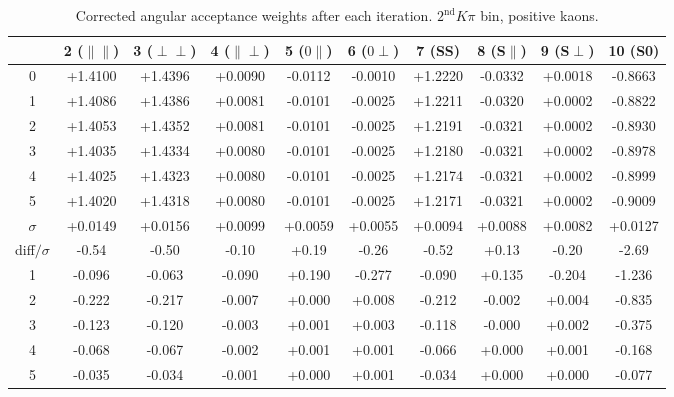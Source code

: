 \begin{table}[h!]
    \center\footnotesize
     \caption{\small Corrected angular acceptance weights after each iteration. $2^{\text{nd}}K\pi$ bin, positive kaons. }
     \begin{tabular}{c c c c c c c c c c}
       & 2 ($\parallel\parallel$) & 3 ($\perp\perp$) & 4 ($\parallel\perp$) & 5 ($0\parallel$) & 
       6 ($0\perp$) & 7 (SS) & 8 (S$\parallel$) & 9 (S$\perp$) & 10 (S0) \\
     \hline
      0 & +1.4100 & +1.4396 & +0.0090 & -0.0112 & -0.0010 & +1.2220 & -0.0332 & +0.0018 & -0.8663\\
      1 & +1.4086 & +1.4386 & +0.0081 & -0.0101 & -0.0025 & +1.2211 & -0.0320 & +0.0002 & -0.8822\\
      2 & +1.4053 & +1.4352 & +0.0081 & -0.0101 & -0.0025 & +1.2191 & -0.0321 & +0.0002 & -0.8930\\
      3 & +1.4035 & +1.4334 & +0.0080 & -0.0101 & -0.0025 & +1.2180 & -0.0321 & +0.0002 & -0.8978\\
      4 & +1.4025 & +1.4323 & +0.0080 & -0.0101 & -0.0025 & +1.2174 & -0.0321 & +0.0002 & -0.8999\\
      5 & +1.4020 & +1.4318 & +0.0080 & -0.0101 & -0.0025 & +1.2171 & -0.0321 & +0.0002 & -0.9009\\
     \hline
      $\sigma$ & +0.0149 & +0.0156 & +0.0099 & +0.0059 & +0.0055 & +0.0094 & +0.0088 & +0.0082 & +0.0127\\
     diff$/\sigma$& -0.54  & -0.50  & -0.10  & +0.19  & -0.26  & -0.52  & +0.13  & -0.20  & -2.69 \\
     \hline
      1 & -0.096  & -0.063  & -0.090  & +0.190  & -0.277  & -0.090  & +0.135  & -0.204  & -1.236 \\
      2 & -0.222  & -0.217  & -0.007  & +0.000  & +0.008  & -0.212  & -0.002  & +0.004  & -0.835 \\
      3 & -0.123  & -0.120  & -0.003  & +0.001  & +0.003  & -0.118  & -0.000  & +0.002  & -0.375 \\
      4 & -0.068  & -0.067  & -0.002  & +0.001  & +0.001  & -0.066  & +0.000  & +0.001  & -0.168 \\
      5 & -0.035  & -0.034  & -0.001  & +0.000  & +0.001  & -0.034  & +0.000  & +0.000  & -0.077 \\     
     \end{tabular}
     \label{tab:norm_weights_evolution_2}
\end{table}
